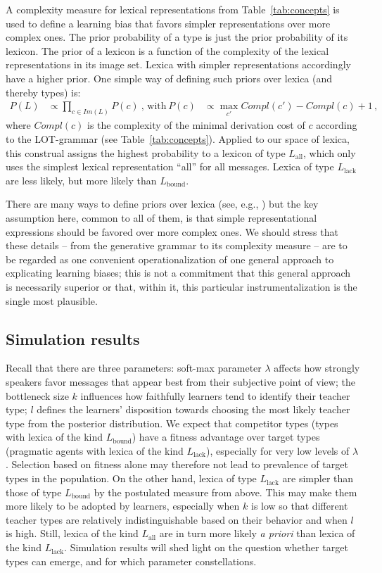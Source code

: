 \documentclass[a4paper, 11pt]{article}
\theoremstyle{Satz}
\newcommand{\mylang}[1]{\ensuremath{L_{\text{#1}}}\xspace} %
\newcommand{\Lall}{\mylang{all}}
\newcommand{\Lbound}{\mylang{bound}}
\newcommand{\Llack}{\mylang{lack}}
\begin{document}
A complexity measure for lexical representations from Table~\ref{tab:concepts} is used to define a
learning bias that favors simpler representations over more complex ones. The prior probability of a
type is just the prior probability of its lexicon. The prior of a lexicon is a function of the
complexity of the lexical representations in its image set. Lexica with simpler representations accordingly have a
higher prior. One simple way of defining such priors over lexica (and thereby types) is:
\begin{align*}
  P(L)  & \propto \prod_{c \in Im(L)} P(c)   \ \text{, with} & 
  P(c) & \propto \max_{c'}Compl(c') - Compl(c) + 1\,,
\end{align*}
where $Compl(c)$ is the complexity of the minimal derivation cost of $c$ according to the
LOT-grammar (see Table~\ref{tab:concepts}). Applied to our space of lexica, this construal assigns the highest probability 
to a lexicon of type $\Lall$, which only uses the simplest lexical representation ``all'' for
all messages. Lexica of type $\Llack$ are less likely, but more likely than $\Lbound$. 

There are many ways to define priors over lexica (see, e.g., \citealt{goodman+etal:2008,
  piantadosi+etal:2012a}) but the key assumption here, common to all of them, is that simple
representational expressions should be favored over more complex ones. We should stress that
these details -- from the generative grammar to its complexity measure -- are to be regarded as
one convenient operationalization of one general approach to explicating learning biases; this
is not a commitment that this general approach is necessarily superior or that, within it, this
particular instrumentalization is the single most plausible.


\subsection{Simulation results}
\label{sec:simulation-results}

Recall that there are three parameters: soft-max parameter $\lambda$ affects how strongly
speakers favor messages that appear best from their subjective point of view; the
bottleneck size $k$ influences how faithfully learners tend to identify their teacher type; $l$
defines the learners' disposition towards choosing the most likely teacher type from the
posterior distribution. We expect that competitor types (types with lexica of the kind
$\Lbound$) have a fitness advantage over target types (pragmatic agents with lexica of the kind
$\Llack$), especially for very low levels of $\lambda$. Selection based on fitness alone may
therefore not lead to prevalence of target types in the population. On the other hand, lexica
of type $\Llack$ are simpler than those of type $\Lbound$ by the postulated measure from
above. This may make them more likely to be adopted by learners, especially when $k$ is low so
that different teacher types are relatively indistinguishable based on their behavior and when
$l$ is high. Still, lexica of the kind $\Lall$ are in turn more likely \emph{a priori} than
lexica of the kind $\Llack$. Simulation results will shed light on the question whether target
types can emerge, and for which parameter constellations.
\end{document}
